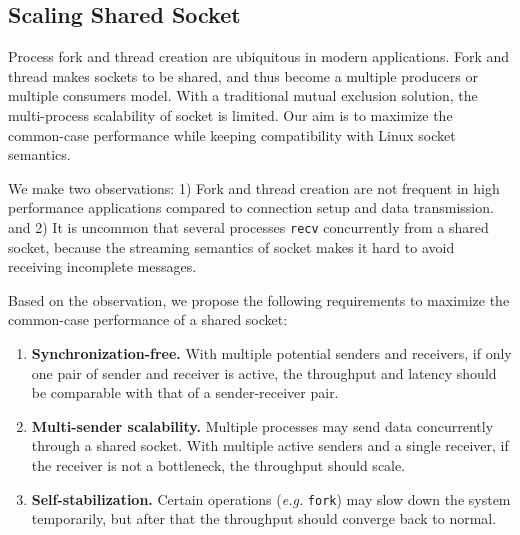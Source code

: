 \subsection{Scaling Shared Socket}
\label{subsec:fork}
Process fork and thread creation are ubiquitous in modern applications. 
Fork and thread makes sockets to be shared, and thus become a multiple producers or multiple consumers model. With a traditional mutual exclusion solution, the multi-process scalability of socket is limited. Our aim is to maximize the common-case performance while keeping compatibility with Linux socket semantics.

We make two observations: 1) Fork and thread creation are not frequent in high performance applications compared to connection setup and data transmission. 
and 2) It is uncommon that several processes \texttt{recv} concurrently from a shared socket, because the streaming semantics of socket makes it hard to avoid receiving incomplete messages. 

Based on the observation, we propose the following requirements to maximize the common-case performance of a shared socket:

\begin{enumerate}
 \item \textbf{Synchronization-free.} With multiple potential senders and receivers, if only one pair of sender and receiver is active, the throughput and latency should be comparable with that of a sender-receiver pair.
 \item \textbf{Multi-sender scalability.} Multiple processes may send data concurrently through a shared socket. With multiple active senders and a single receiver, if the receiver is not a bottleneck, the throughput should scale.
 \item \textbf{Self-stabilization.} Certain operations (\textit{e.g.} \texttt{fork}) may slow down the system temporarily, but after that the throughput should converge back to normal.
\end{enumerate}

